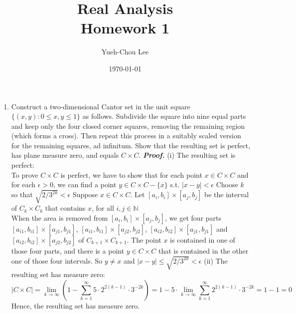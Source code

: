 \documentclass[a4paper,11pt]{article}
\title{Real Analysis \\ Homework 1}
\author{Yueh-Chou Lee}
\date{\today}
\begin{document}
\maketitle
\begin{enumerate}
\item {Construct a two-dimensional Cantor set in the unit square $\{(x,y): 0 \leq x,y \leq 1\}$ as follows. Subdivide the square into nine equal parts and keep only the four closed corner squares, removing the remaining region (which forms a cross). Then repeat this process in a suitably scaled version for the remaining squares, ad infinitum. Show that the resulting set is perfect, has plane measure zero, and equals $C \times C$}.
\newline
\newline
\textit{\textbf {Proof.}}
\newline
(i) The resulting set is perfect:\\
To prove $C \times C$ is perfect, we have to show that for each point $x \in C \times C$ and for each $\epsilon > 0$, we can find a point $y \in C \times C - \{x\}$ s.t. $\left| x - y \right| < \epsilon$
\newline
\newline
Choose $k$ so that $\sqrt{ 2 / 3^{2k}} < \epsilon$
\newline
\newline
Suppose $x \in C \times C$. Let $[a_i, b_i] \times [a_j,b_j]$ be the interval of $C_k \times C_k$ that contains $x$, for all $i,j \in \mathbb{N}$\\
\newline
When the area is removed from $[a_i, b_i] \times [a_j,b_j]$, we get four parts $[a_{i1}, b_{i1}] \times [a_{j1},b_{j1}]$, $[a_{i1}, b_{i1}] \times [a_{j2},b_{j2}]$, $[a_{i2}, b_{i2}] \times [a_{j1},b_{j1}]$ and $[a_{i2}, b_{i2}] \times [a_{j2},b_{j2}]$ of $C_{k+1} \times C_{k+1}$. The point $x$ is contained in one of those four parts, and there is a point $y \in C \times C$ that is contained in the other one of those four intervals. So $y \neq x$ and $|x - y| \leq \sqrt{ 2 / 3^{2k}} < \epsilon$
\newline
\newline
(ii) The resulting set has measure zero:\\
$$|C \times C| = \lim_{k \to \infty} (1 - \sum_{k = 1}^{\infty} 5 \cdot 2^{2(k-1)} \cdot 3^{-2k}) = 1 - 5 \cdot \lim_{k \to \infty} \sum_{k = 1}^{\infty} 2^{2(k-1)} \cdot 3^{-2k} = 1 - 1 = 0$$
Hence, the resulting set has measure zero.
\newline
\newline




\end{enumerate}
\end{document}
